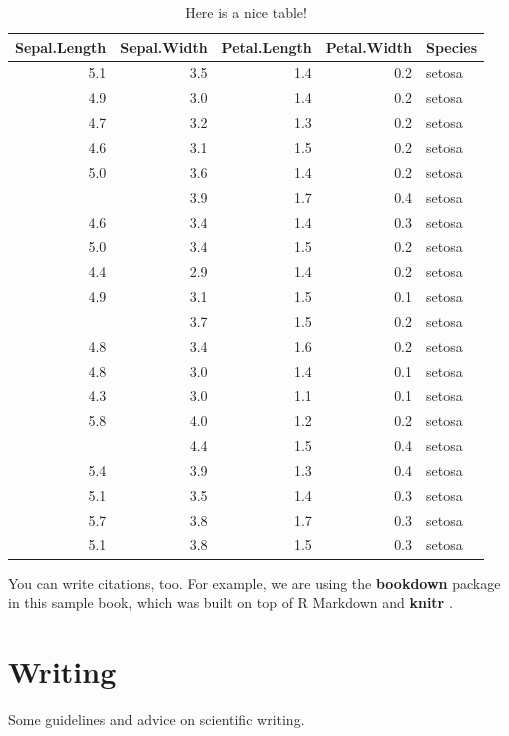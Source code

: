 \documentclass[
]{book}
\begin{document}
\begin{table}

\caption{\label{tab:nice-tab}Here is a nice table!}
\centering
\begin{tabular}[t]{rrrrl}
\toprule
Sepal.Length & Sepal.Width & Petal.Length & Petal.Width & Species\\
\midrule
5.1 & 3.5 & 1.4 & 0.2 & setosa\\
4.9 & 3.0 & 1.4 & 0.2 & setosa\\
4.7 & 3.2 & 1.3 & 0.2 & setosa\\
4.6 & 3.1 & 1.5 & 0.2 & setosa\\
5.0 & 3.6 & 1.4 & 0.2 & setosa\\
\addlinespace
5.4 & 3.9 & 1.7 & 0.4 & setosa\\
4.6 & 3.4 & 1.4 & 0.3 & setosa\\
5.0 & 3.4 & 1.5 & 0.2 & setosa\\
4.4 & 2.9 & 1.4 & 0.2 & setosa\\
4.9 & 3.1 & 1.5 & 0.1 & setosa\\
\addlinespace
5.4 & 3.7 & 1.5 & 0.2 & setosa\\
4.8 & 3.4 & 1.6 & 0.2 & setosa\\
4.8 & 3.0 & 1.4 & 0.1 & setosa\\
4.3 & 3.0 & 1.1 & 0.1 & setosa\\
5.8 & 4.0 & 1.2 & 0.2 & setosa\\
\addlinespace
5.7 & 4.4 & 1.5 & 0.4 & setosa\\
5.4 & 3.9 & 1.3 & 0.4 & setosa\\
5.1 & 3.5 & 1.4 & 0.3 & setosa\\
5.7 & 3.8 & 1.7 & 0.3 & setosa\\
5.1 & 3.8 & 1.5 & 0.3 & setosa\\
\bottomrule
\end{tabular}
\end{table}

You can write citations, too. For example, we are using the \textbf{bookdown} package \citep{R-bookdown} in this sample book, which was built on top of R Markdown and \textbf{knitr} \citep{xie2015}.

\hypertarget{writing}{%
\chapter{Writing}\label{writing}}

Some guidelines and advice on scientific writing.
\end{document}
